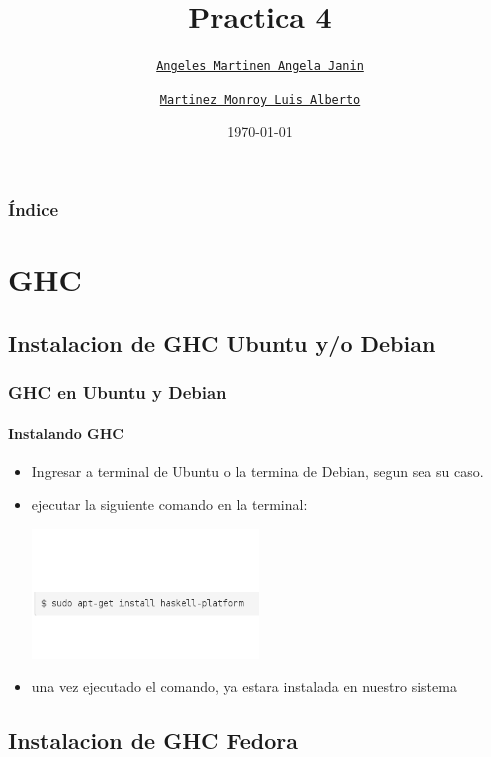 \documentclass[hyperref={pdfpagelayout=SinglePage}]{beamer} %
\title[Practica 4]{Practica 4}
\author[Angela Janin, Luis Alberto]{
  \texttt{\href{mailto:angelajanin@ciencias.unam.mx}{Angeles Martinen Angela Janin}}\\
  \and
  \texttt{\href{mailto:luis_martinez98@ciencias.unam.mx}{Martinez Monroy Luis Alberto}}
}
\date{\today}
\begin{document}
\begin{frame}
  \titlepage
\end{frame}

\begin{frame}
  \frametitle{Índice}
  \tableofcontents
\end{frame}

\section{GHC}
\subsection{Instalacion de GHC Ubuntu y/o Debian}

\begin{frame}
  \frametitle{GHC en Ubuntu y Debian}
  \framesubtitle{Instalando GHC}
  \begin{itemize}[<+->]
  \item Ingresar a terminal de Ubuntu o la termina de Debian, segun sea su caso.
  \item ejecutar la siguiente comando en la terminal:\\\begin{center}
                                                    \includegraphics[width=6cm]{ghcubuntu.png}
                                                \end{center}
  \item una vez ejecutado el comando, ya estara instalada en nuestro sistema

  \end{itemize}
\end{frame}
\subsection{Instalacion de GHC Fedora}
\end{document}
